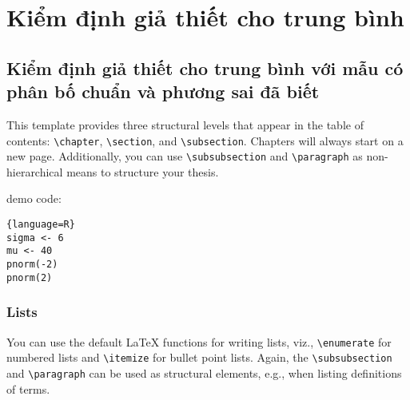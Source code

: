 
\chapter{Kiểm định giả thiết cho trung bình}

\section{Kiểm định giả thiết cho trung bình với mẫu có phân bố chuẩn và phương sai đã biết}
This template provides three structural levels that appear in the table of contents: \texttt{\textbackslash chapter}, \texttt{\textbackslash section}, and \texttt{\textbackslash subsection}. Chapters will always start on a new page. Additionally, you can use \texttt{\textbackslash subsubsection} and \texttt{\textbackslash paragraph} as non-hierarchical means to structure your thesis.

demo code: 
\begin{lstlisting}{language=R}
sigma <- 6
mu <- 40
pnorm(-2)
pnorm(2)
\end{lstlisting}


\subsection{Lists}
You can use the default \LaTeX \- functions for writing lists, viz., \texttt{\textbackslash enumerate} for numbered lists and \texttt{\textbackslash itemize} for bullet point lists. Again, the \texttt{\textbackslash subsubsection} and \texttt{\textbackslash paragraph} can be used as structural elements, e.g., when listing definitions of terms.


